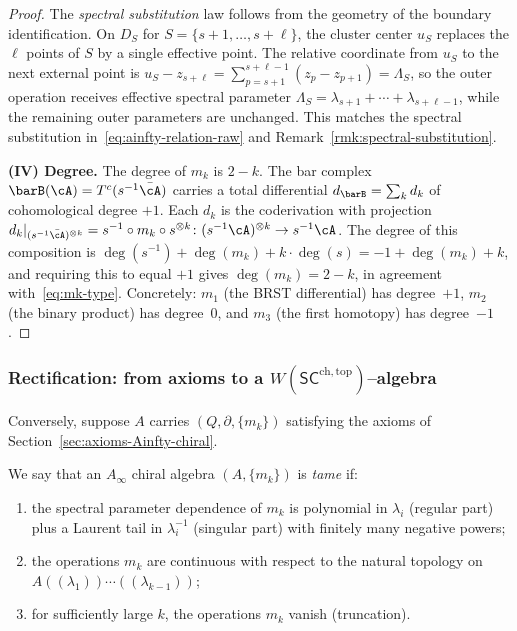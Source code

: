 \begin{proof}
The \emph{spectral substitution} law follows from the geometry of the boundary identification. On $D_S$ for $S = \{s{+}1,\ldots,s{+}\ell\}$, the cluster center $u_S$ replaces the $\ell$ points of $S$ by a single effective point. The relative coordinate from $u_S$ to the next external point is $u_S - z_{s+\ell} = \sum_{p=s+1}^{s+\ell-1}(z_p - z_{p+1}) = \Lambda_S$, so the outer operation receives effective spectral parameter $\Lambda_S = \lambda_{s+1} + \cdots + \lambda_{s+\ell-1}$, while the remaining outer parameters are unchanged. This matches the spectral substitution in~\eqref{eq:ainfty-relation-raw} and Remark~\ref{rmk:spectral-substitution}.

\medskip
\textbf{(IV) Degree.}
The degree of $m_k$ is $2 - k$. The bar complex $\barB(\cA) = T^c(s^{-1}\bar{\cA})$ carries a total differential $d_{\barB} = \sum_k d_k$ of cohomological degree $+1$. Each $d_k$ is the coderivation with projection
$d_k|_{(s^{-1}\bar{\cA})^{\otimes k}} = s^{-1} \circ m_k \circ s^{\otimes k}\colon (s^{-1}\cA)^{\otimes k} \to s^{-1}\cA$.
The degree of this composition is $\deg(s^{-1}) + \deg(m_k) + k\cdot\deg(s) = -1 + \deg(m_k) + k$, and requiring this to equal $+1$ gives $\deg(m_k) = 2 - k$, in agreement with~\eqref{eq:mk-type}. Concretely: $m_1$ (the BRST differential) has degree~$+1$, $m_2$ (the binary product) has degree~$0$, and $m_3$ (the first homotopy) has degree~$-1$.
\end{proof}

\subsubsection{Rectification: from axioms to a $W(\mathsf{SC}^{\mathrm{ch,top}})$--algebra}
\label{subsec:rectification}
Conversely, suppose $A$ carries $(Q,\partial,\{m_k\})$ satisfying the axioms of Section~\ref{sec:axioms-Ainfty-chiral}.

\begin{definition}[Tameness]\label{def:tameness}
We say that an $A_\infty$ chiral algebra $(A, \{m_k\})$ is \emph{tame} if:
\begin{enumerate}[label=(\alph*)]
\item the spectral parameter dependence of $m_k$ is polynomial in $\lambda_i$ (regular part) plus a Laurent tail in $\lambda_i^{-1}$ (singular part) with finitely many negative powers;
\item the operations $m_k$ are continuous with respect to the natural topology on $A((\lambda_1)) \cdots ((\lambda_{k-1}))$;
\item for sufficiently large $k$, the operations $m_k$ vanish (truncation).
\end{enumerate}
\end{definition}

